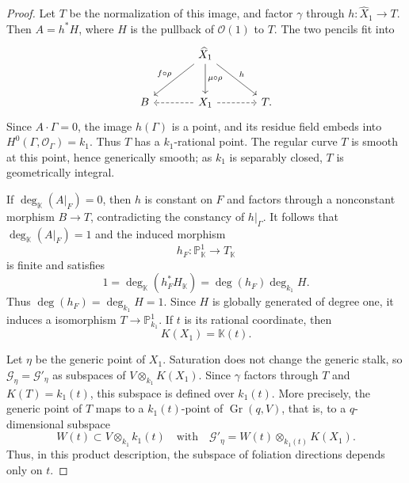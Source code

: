 \documentclass[10pt,abstract=true]{scrartcl}
\numberwithin{equation}{section}
\theoremstyle{definition}
\theoremstyle{remark}
\begin{document}
\begin{proof}
  Let $T$ be the normalization of this image, and factor $\gamma$ through $h\colon \widehat X_1\to T$.
  Then $A=h^*H$, where $H$ is the pullback of $\mathcal O(1)$ to $T$.
  The two pencils fit into
  \[
    \begin{tikzcd}[column sep=large,row sep=large]
      & \widehat X_1 \ar[dl,"f\circ\rho"'] \ar[d,"\mu\circ\rho"] \ar[dr,"h"] & \\
      B & X_1 \ar[l,dashed] \ar[r,dashed] & T.
    \end{tikzcd}
  \]
  Since $A\cdot\Gamma=0$, the image $h(\Gamma)$ is a point, and its residue field embeds into $H^0(\Gamma,\mathcal O_\Gamma)=k_1$.
  Thus $T$ has a $k_1$-rational point.
  The regular curve $T$ is smooth at this point, hence generically smooth; as $k_1$ is separably closed, $T$ is geometrically integral.

  If $\deg_{\mathbb K}(A|_F)=0$, then $h$ is constant on $F$ and factors through a nonconstant morphism $B\to T$, contradicting the constancy of $h|_\Gamma$.
  It follows that $\deg_{\mathbb K}(A|_{F}) = 1$ and the induced morphism \[
    h_F\colon\mathbb P^1_{\mathbb K}\to T_{\mathbb K}
  \]
  is finite and satisfies
  \[
    1 = \deg_{\mathbb K}(h_F^*H_{\mathbb K}) = \deg(h_F)\deg_{k_1}H.
  \]
  Thus $\deg(h_F) = \deg_{k_1}H = 1$.
  Since $H$ is globally generated of degree one, it induces a isomorphism $T\to\mathbb P^1_{k_1}$.
  If $t$ is its rational coordinate, then
  \begin{equation}\label{eq:caseC-p3-second-pencil}
    K(X_1)=\mathbb K(t).
  \end{equation}

  Let $\eta$ be the generic point of $X_1$.
  Saturation does not change the generic stalk, so $\mathscr G_\eta = \mathscr G'_\eta$ as subspaces of $V\otimes_{k_1}K(X_1)$.
  Since $\gamma$ factors through $T$ and $K(T)=k_1(t)$, this subspace is defined over $k_1(t)$.
  More precisely, the generic point of $T$ maps to a $k_1(t)$-point of $\operatorname{Gr}(q,V)$, that is, to a $q$-dimensional subspace
  \[
    W(t)\subset V\otimes_{k_1}k_1(t)
    \quad\text{with}\quad
    \mathscr G'_\eta=W(t)\otimes_{k_1(t)}K(X_1).
  \]
  Thus, in this product description, the subspace of foliation directions depends only on $t$.


\end{proof}
\end{document}
